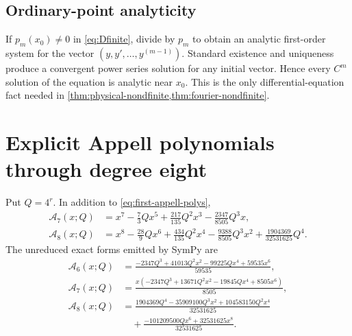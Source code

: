 \documentclass[11pt,oneside]{article}
\theoremstyle{definition}
\theoremstyle{remark}
\newcommand{\Acard}{\mathcal A}
\begin{document}
\subsection{Ordinary-point analyticity}
If $p_m(x_0)\ne0$ in \eqref{eq:Dfinite}, divide by $p_m$ to obtain an analytic first-order system for the vector
$(y,y',\ldots,y^{(m-1)})$.  Standard existence and uniqueness produce a convergent power series solution for any initial vector.  Hence every $C^m$ solution of the equation is analytic near $x_0$.  This is the only differential-equation fact needed in \cref{thm:physical-nondfinite,thm:fourier-nondfinite}.

\section{Explicit Appell polynomials through degree eight}
\label{app:polynomials}
Put $Q=4^r$.  In addition to \eqref{eq:first-appell-polys},
\begin{align*}
 \Acard_7(x;Q)
 &=x^7-\frac73Qx^5+\frac{217}{135}Q^2x^3
   -\frac{2347}{8505}Q^3x,\\[0.4em]
 \Acard_8(x;Q)
 &=x^8-\frac{28}{9}Qx^6+\frac{434}{135}Q^2x^4
   -\frac{9388}{8505}Q^3x^2
   +\frac{1904369}{32531625}Q^4.
\end{align*}
The unreduced exact forms emitted by SymPy are
\begin{align*}
 \Acard_6(x;Q)
 &=\frac{-2347Q^3+41013Q^2x^2-99225Qx^4+59535x^6}{59535},\\
 \Acard_7(x;Q)
 &=\frac{x(-2347Q^3+13671Q^2x^2-19845Qx^4+8505x^6)}{8505},\\
 \Acard_8(x;Q)
 &=\frac{1904369Q^4-35909100Q^3x^2+104583150Q^2x^4}{32531625}\\
 &\quad+\frac{-101209500Qx^6+32531625x^8}{32531625}.
\end{align*}
\end{document}
